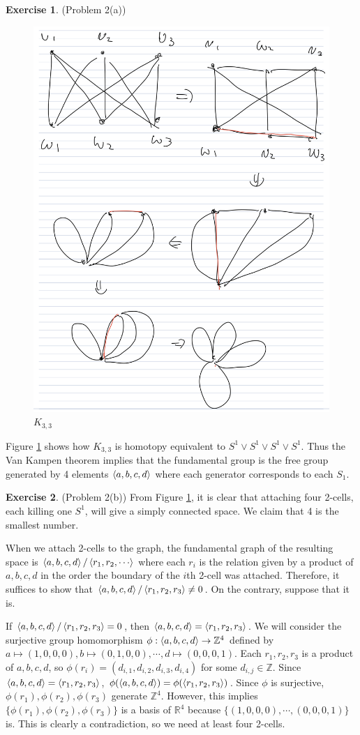 \documentclass[12pt, psamsfonts]{amsart}
\theoremstyle{definition}
\newtheorem*{exer}{Exercise}
\theoremstyle{remark}
\numberwithin{equation}{section}
\begin{document}
\begin{exer}{(Problem 2(a))}
 \begin{figure}[!htb]
   \includegraphics[width=.5\linewidth]{k33.jpeg}
   \caption{$K_{3, 3}$}
   \label{fig:k33}
 \end{figure}
 Figure \ref{fig:k33} shows how $K_{3, 3}$ is homotopy equivalent to $S^1 \vee S^1 \vee S^1 \vee S^1$.
 Thus the Van Kampen theorem implies that the fundamental group is the free group generated by 4 elements $\ev{ a, b, c, d }$ where each generator corresponds to each $S_1$.
\end{exer}

\begin{exer}{(Problem 2(b))}
  From Figure \ref{fig:k33}, it is clear that attaching four 2-cells, each killing one $S^1$, will give a simply connected space.
  We claim that 4 is the smallest number.

  When we attach 2-cells to the graph, the fundamental graph of the resulting space is $\ev{ a, b, c, d} / \ev{ r_1, r_2, \cdots }$ where each $r_i$ is the relation given by a product of $a, b, c, d$ in the order the boundary of the $i$th 2-cell was attached.
  Therefore, it suffices to show that $\ev{a, b, c, d} / \ev{r_1, r_2, r_3} \ne 0$.
  On the contrary, suppose that it is.
  
  If $\ev{a, b, c, d} / \ev{r_1, r_2, r_3} = 0$, then $\ev{a, b, c, d} = \ev{r_1, r_2, r_3}$.
  We will consider the surjective group homomorphism $\phi: \ev{a, b, c, d} \rightarrow \mathbb{Z}^4$ defined by $a \mapsto (1, 0, 0, 0), b \mapsto (0, 1, 0, 0), \cdots, d \mapsto (0, 0, 0, 1)$.
  Each $r_1, r_2, r_3$ is a product of $a, b, c, d$, so $\phi(r_i) = (d_{i, 1}, d_{i, 2}, d_{i, 3}, d_{i, 4})$ for some $d_{i, j} \in \mathbb{Z}$.
  Since $\ev{a, b, c, d} = \ev{r_1, r_2, r_3}$, $\phi(\ev{a, b, c, d}) = \phi(\ev{r_1, r_2, r_3})$.
  Since $\phi$ is surjective, $\phi(r_1), \phi(r_2), \phi(r_3)$ generate $\mathbb{Z}^4$.
  However, this implies $\{ \phi(r_1), \phi(r_2), \phi(r_3) \}$ is a basis of $\mathbb{R}^4$ because $\{ (1, 0, 0, 0), \cdots, (0, 0, 0, 1) \}$ is.
  This is clearly a contradiction, so we need at least four 2-cells.
\end{exer}
\end{document}
